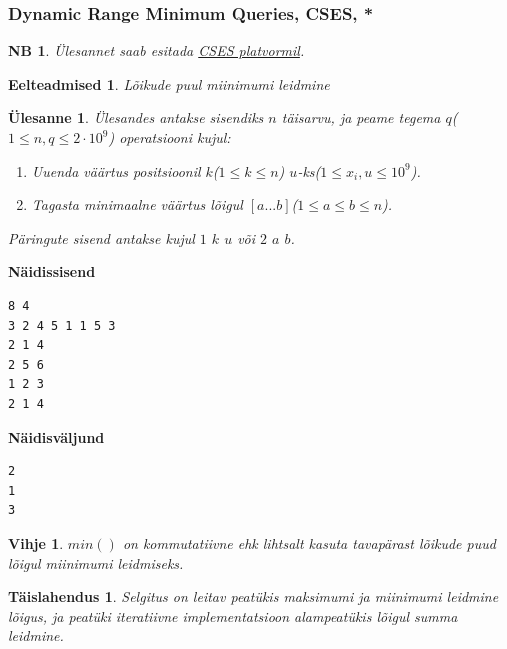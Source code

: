 \documentclass{trkut}
\newtheorem*{prereq}{Eelteadmised}
\newtheorem*{extra}{NB}
\newtheorem*{vihje}{Vihje}
\newtheorem*{solution}{Täislahendus}
\newtheorem*{Text}{Ülesanne}
\begin{document}
\subsubsection{Dynamic Range Minimum Queries, CSES, *} 
\begin{extra}
Ülesannet saab esitada \href{https://cses.fi/problemset/task/1649}{CSES platvormil}.
\end{extra}
\begin{prereq}
Lõikude puul miinimumi leidmine
\end{prereq}
\begin{Text}
Ülesandes antakse sisendiks $n$ täisarvu, ja peame tegema $q$($1\le n,q\le 2\cdot10^9$) operatsiooni kujul: 
\begin{enumerate}
    \item Uuenda väärtus positsioonil $k$($1\le k\le n$) $u$-ks($1\le x_i,u\le 10^9$).
    \item Tagasta minimaalne väärtus lõigul $[a...b]$($1\le a\le b\le n$).
\end{enumerate}
Päringute sisend antakse kujul $1$ $k$ $u$ või $2$ $a$ $b$.

\parencite{min}
\end{Text}



\textbf{Näidissisend
}
\begin{verbatim}
8 4
3 2 4 5 1 1 5 3
2 1 4
2 5 6
1 2 3
2 1 4
\end{verbatim}

\textbf{Näidisväljund}

\begin{verbatim}
2
1
3
\end{verbatim}



\begin{vihje}
$min()$ on kommutatiivne ehk lihtsalt kasuta tavapärast lõikude puud lõigul miinimumi leidmiseks.
\end{vihje}
\begin{solution}
Selgitus on leitav peatükis maksimumi ja miinimumi leidmine lõigus, ja peatüki iteratiivne implementatsioon alampeatükis lõigul summa leidmine.
\end{solution}
\end{document}
